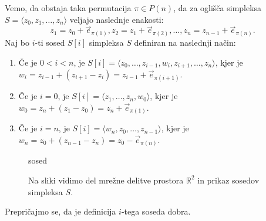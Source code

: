 \documentclass[mat1]{fmfdelo}
\newcommand{\R}{\mathbb R}
\newcommand{\0}{0}
\begin{document}
\begin{dokaz}
Vemo, da obstaja taka permutacija $\pi \in P(n)$, da za oglišča simpleksa $S = \langle z_0, z_1, \dots, z_n \rangle$ veljajo naslednje enakosti:
\begin{equation}\label{eq:orientiran-simpleks}
z_1 = z_0 + \vec{e}_{\pi(1)}, z_2 = z_1 + \vec{e}_{\pi(2)}, \dots, z_n = z_{n-1} + \vec{e}_{\pi(n)}.
\end{equation}
Naj bo $i$-ti sosed $S[i]$ simpleksa $S$ definiran na naslednji način:
\begin{enumerate}
\item Če je $0 < i < n$,  je $S[i] = \langle z_0, \dots, z_{i-1}, w_i, z_{i+1}, \dots, z_n \rangle$, kjer je $w_i = z_{i-1} + (z_{i+1} - z_i) = z_{i-1} + \vec{e}_{\pi(i+1)}$.
\item Če je $i = 0$, je $S[i] = \langle z_1, \dots, z_n, w_0 \rangle$, kjer je $w_0 = z_n + (z_1 - z_0) = z_{n} + \vec{e}_{\pi(1)}$.
\item Če je $i = n$, je $S[i] = \langle w_n, z_0, \dots, z_{n-1} \rangle$, kjer je $w_n = z_0 + (z_{n-1} - z_n) = z_{0} - \vec{e}_{\pi(n)}$.
\end{enumerate}
\begin{figure}[h!]    
	\centering
		{sosed}
	\caption{Na sliki vidimo del mrežne delitve prostora $\R^2$ in prikaz sosedov simpleksa $S$.}
\end{figure}
Prepričajmo se, da je definicija $i$-tega soseda dobra.



\end{dokaz}
\end{document}
